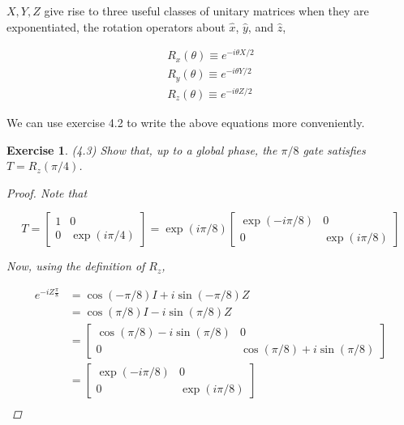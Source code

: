 \documentclass[11pt]{article}
\newcommand\0{\mathbf{0}}
\newcommand\<{\langle}
\renewcommand\>{\rangle}
\newtheorem{exercise}[theorem]{Exercise}
\begin{document}
$X, Y, Z$ give rise to three useful classes of unitary matrices when they are exponentiated, the rotation operators about $\hat{x}$, $\hat{y}$, and $\hat{z}$,

\begin{align*}
R_x(\theta) \equiv e^{-i \theta X / 2} \\
R_y(\theta) \equiv e^{-i \theta Y / 2} \\
R_z(\theta) \equiv e^{-i \theta Z / 2} 
\end{align*}

We can use exercise 4.2 to write the above equations more conveniently.

\begin{exercise} (4.3) Show that, up to a global phase, the $\pi /8$ gate satisfies $T = R_z(\pi /4)$.

\begin{proof}

Note that 

$$
T = \begin{bmatrix}1 & 0 \\ 0 & \exp(i\pi / 4) \end{bmatrix} = \exp(i\pi / 8)\begin{bmatrix} \exp(-i \pi / 8)  & 0 \\ 0 & \exp(i \pi / 8)  \end{bmatrix} 
$$

Now, using the definition of $R_z$,

\begin{align*}
	e^{-i Z \frac{\pi}{8}} &= \cos(-\pi/8) I + i\sin (-\pi / 8)Z \\
	&=  \cos(\pi/8) I - i\sin (\pi / 8)Z \\
	&= \begin{bmatrix} \cos(\pi / 8) - i \sin (\pi / 8) & 0 \\ 0 & \cos(\pi/8) + i \sin (\pi / 8) \end{bmatrix} \\
	&= \begin{bmatrix} \exp(-i \pi / 8)  & 0 \\ 0 & \exp(i \pi / 8)  \end{bmatrix} \\
\end{align*}
\end{proof}
\end{exercise}
\end{document}
